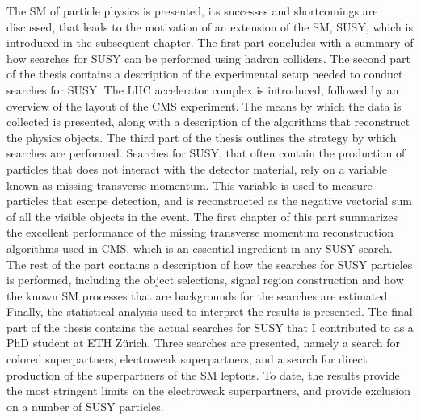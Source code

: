 The SM of particle physics is presented, its successes and shortcomings are discussed, that leads to the motivation of an extension of the SM, SUSY, which is introduced in the subsequent chapter. 
The first part concludes with a summary of how searches for SUSY can be performed using hadron colliders. 
\newpara
\noindent\justify
The second part of the thesis contains a description of the experimental setup needed to conduct searches for SUSY. 
The LHC accelerator complex is introduced, followed by an overview of the layout of the CMS experiment. 
The means by which the data is collected is presented, along with a description of the algorithms that reconstruct the physics objects.  
\newpara
\noindent\justify
The third part of the thesis outlines the strategy by which searches are performed. 
Searches for SUSY, that often contain the production of particles that does not interact with the detector material, rely on a variable known as missing transverse momentum. 
This variable is used to measure particles that escape detection, and is reconstructed as the negative vectorial sum of all the visible objects in the event. 
The first chapter of this part summarizes the excellent performance of the missing transverse momentum reconstruction algorithms used in CMS, which is an essential ingredient in any SUSY search. 
The rest of the part contains a description of how the searches for SUSY particles is performed, including the object selections, signal region construction and how the known SM processes that are backgrounds for the searches are estimated. 
Finally, the statistical analysis used to interpret the results is presented.   
\newpara
\noindent\justify
The final part of the thesis contains the actual searches for SUSY that I contributed to as a PhD student at ETH Z\"{u}rich. 
Three searches are presented, namely a search for colored superpartners, electroweak superpartners, and a search for direct production of the superpartners of the SM leptons. 
To date, the results provide the most stringent limits on the electroweak superpartners, and provide exclusion on a number of SUSY particles.   



